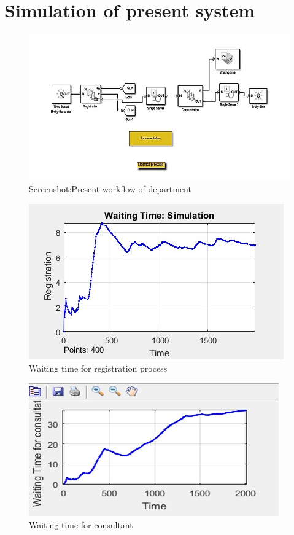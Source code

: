 \documentclass[12pt,a4paper]{report}
\begin{document}
\section{Simulation of present system}
\begin{figure}[h!]
	\begin{center}
		\includegraphics[scale=1]{pr2.jpg}
		\caption{Screenshot:Present workflow of department}
	\end{center}
\end{figure}
\begin{figure}[h!]
	\begin{center}
		\includegraphics[scale=1.1]{exp2.jpg}
		\caption{Waiting time for registration process}
	\end{center}
\end{figure}
\begin{figure}[h!]
	\begin{center}
		\includegraphics[scale=1.1]{exp1.jpg}
		\caption{Waiting time for consultant}
	\end{center}
\end{figure}
\clearpage
\end{document}
